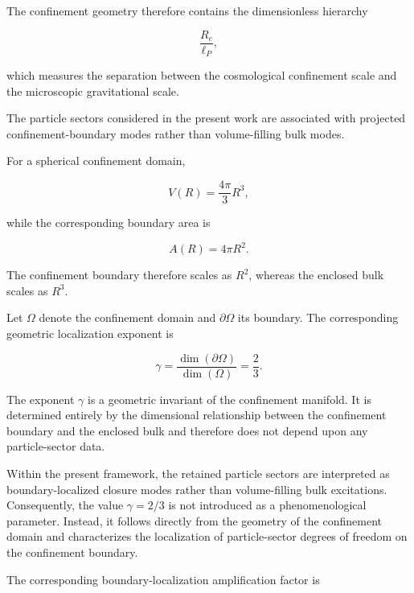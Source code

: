 \documentclass[11pt]{article}
\theoremstyle{definition}
\theoremstyle{remark}
\begin{document}
The confinement geometry therefore contains the dimensionless hierarchy

\begin{equation}
\frac{R_c}{\ell_P},
\label{eq:RcOverLp}
\end{equation}

which measures the separation between the cosmological confinement
scale and the microscopic gravitational scale.

The particle sectors considered in the present work are associated
with projected confinement-boundary modes rather than volume-filling
bulk modes.

For a spherical confinement domain,

\begin{equation}
V(R) = \frac{4\pi}{3}R^3,
\label{eq:VolumeSphere}
\end{equation}

while the corresponding boundary area is

\begin{equation}
A(R) = 4\pi R^2.
\label{eq:AreaSphere}
\end{equation}

The confinement boundary therefore scales as \(R^2\), whereas the
enclosed bulk scales as \(R^3\).

Let \(\Omega\) denote the confinement domain and
\(\partial\Omega\) its boundary. The corresponding geometric
localization exponent is

\begin{equation}
\gamma =
\frac{\dim(\partial\Omega)}
{\dim(\Omega)}
=
\frac{2}{3}.
\label{eq:BoundaryExponent}
\end{equation}

The exponent \(\gamma\) is a geometric invariant of the confinement
manifold. It is determined entirely by the dimensional relationship
between the confinement boundary and the enclosed bulk and therefore
does not depend upon any particle-sector data.

Within the present framework, the retained particle sectors are
interpreted as boundary-localized closure modes rather than
volume-filling bulk excitations. Consequently, the value
\(\gamma=2/3\) is not introduced as a phenomenological parameter.
Instead, it follows directly from the geometry of the confinement
domain and characterizes the localization of particle-sector
degrees of freedom on the confinement boundary.

The corresponding boundary-localization amplification factor is
\end{document}
